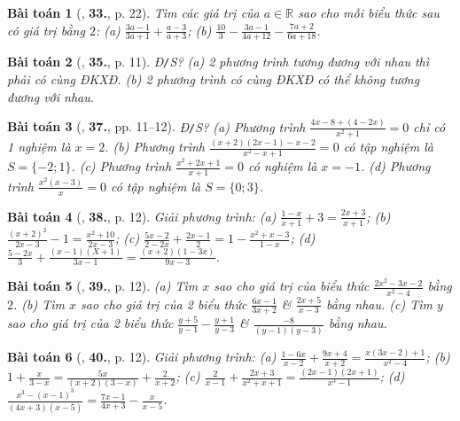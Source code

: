 \documentclass{article}
\numberwithin{equation}{section}
\newtheorem{baitoan}{Bài toán}
\begin{document}
\begin{baitoan}[\cite{SGK_Toan_8_tap_2}, \textbf{33.}, p. 22]
	Tìm các giá trị của $a\in\mathbb{R}$ sao cho mỗi biểu thức sau có giá trị bằng $2$: (a) $\frac{3a - 1}{3a + 1} + \frac{a - 3}{a + 3}$; (b) $\frac{10}{3} - \frac{3a - 1}{4a + 12} - \frac{7a + 2}{6a + 18}$.
\end{baitoan}

\begin{baitoan}[\cite{SBT_Toan_8_tap_2}, \textbf{35.}, p. 11]
	\emph{Đ\texttt{/}S?} (a) 2 phương trình tương đương với nhau thì phải có cùng ĐKXĐ. (b) 2 phương trình có cùng ĐKXĐ có thể không tương đương với nhau.
\end{baitoan}

\begin{baitoan}[\cite{SBT_Toan_8_tap_2}, \textbf{37.}, pp. 11--12]
	\emph{Đ\texttt{/}S?} (a) Phương trình $\frac{4x - 8 + (4 - 2x)}{x^2 + 1} = 0$ chỉ có 1 nghiệm là $x = 2$. (b) Phương trình $\frac{(x + 2)(2x - 1) - x - 2}{x^2 - x + 1} = 0$ có tập nghiệm là $S = \{-2;1\}$. (c) Phương trình $\frac{x^2 + 2x + 1}{x + 1} = 0$ có nghiệm là $x = -1$. (d) Phương trình $\frac{x^2(x - 3)}{x} = 0$ có tập nghiệm là $S = \{0;3\}$.
\end{baitoan}

\begin{baitoan}[\cite{SBT_Toan_8_tap_2}, \textbf{38.}, p. 12]
	Giải phương trình: (a) $\frac{1 - x}{x + 1} + 3 = \frac{2x + 3}{x + 1}$; (b) $\frac{(x + 2)^2}{2x - 3} - 1 = \frac{x^2 + 10}{2x - 3}$; (c) $\frac{5x - 2}{2 - 2x} + \frac{2x - 1}{2} = 1 - \frac{x^2 + x - 3}{1 - x}$; (d) $\frac{5 - 2x}{3} + \frac{(x - 1)(X + 1)}{3x - 1} = \frac{(x + 2)(1 - 3x)}{9x - 3}$.
\end{baitoan}

\begin{baitoan}[\cite{SBT_Toan_8_tap_2}, \textbf{39.}, p. 12]
	(a) Tìm $x$ sao cho giá trị của biểu thức $\frac{2x^2 - 3x - 2}{x^2 - 4}$ bằng $2$. (b) Tìm $x$ sao cho giá trị của 2 biểu thức $\frac{6x - 1}{3x + 2}$ \& $\frac{2x + 5}{x - 3}$ bằng nhau. (c) Tìm $y$ sao cho giá trị của 2 biểu thức $\frac{y + 5}{y - 1} - \frac{y + 1}{y - 3}$ \& $\frac{-8}{(y - 1)(y - 3)}$ bằng nhau.
\end{baitoan}

\begin{baitoan}[\cite{SBT_Toan_8_tap_2}, \textbf{40.}, p. 12]
	Giải phương trình: (a) $\frac{1 - 6x}{x - 2} + \frac{9x + 4}{x + 2} = \frac{x(3x - 2) + 1}{x^2 - 4}$; (b) $1 + \frac{x}{3 - x} = \frac{5x}{(x + 2)(3 - x)} + \frac{2}{x + 2}$; (c) $\frac{2}{x - 1} + \frac{2x + 3}{x^2 + x + 1} = \frac{(2x - 1)(2x + 1)}{x^3 - 1}$; (d) $\frac{x^3 - (x - 1)^3}{(4x + 3)(x - 5)} = \frac{7x - 1}{4x + 3} - \frac{x}{x - 5}$.
\end{baitoan}
\end{document}
